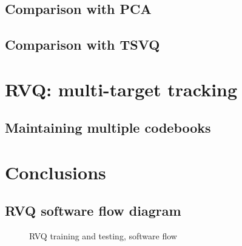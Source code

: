 \documentclass[12pt,letterpaper,doublespaced,ETD]{gt-ece-thesis} %
\begin{document}
\begin{Body}
\section{Comparison with PCA}



\section{Comparison with TSVQ}


\chapter{RVQ: multi-target tracking}
\label{chap_RVQ_MTT}	

\section{Maintaining multiple codebooks}

\chapter{Conclusions}
\label{chap_Conclusions}	


\label{app:AppendixA}


\newpage
\section{RVQ software flow diagram}
\label{app:RVQ_sw_flowDiagram}	

\begin{figure}[htp]
	\centering	
	\caption{RVQ training and testing, software flow}
	\label{fig:RVQ_testing}	
\end{figure}










\end{Body}
\begin{EndMatter}
\end{EndMatter}
\end{document}
